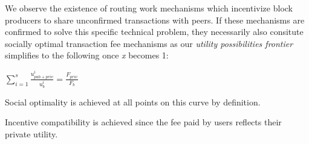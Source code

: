 \documentclass[oneside]{article}   	%
\begin{document}
We observe the existence of routing work mechanisms which incentivize block producers to share unconfirmed transactions with peers. If these mechanisms are confirmed to solve this specific technical problem, they necessarily also consitute socially optimal transaction fee mechanisms as our \textit{utility possibilities frontier} simplifies to the following once \textit{x} becomes 1:

\LARGE
\begin{adjustwidth}{1.5em}{1.5em} 
\begin{math}
\sum_{i=1}^{s} \frac{u_{{pub}+{priv}}^i}{u_b^i} = \frac{F_{{priv}}}{F_b}
\end{math}
\end{adjustwidth}
\normalsize

Social optimality is achieved at all points on this curve by definition.

Incentive compatibility is achieved since the fee paid by users reflects their private utility.

\pagebreak

\nocite{*}
\end{document}
